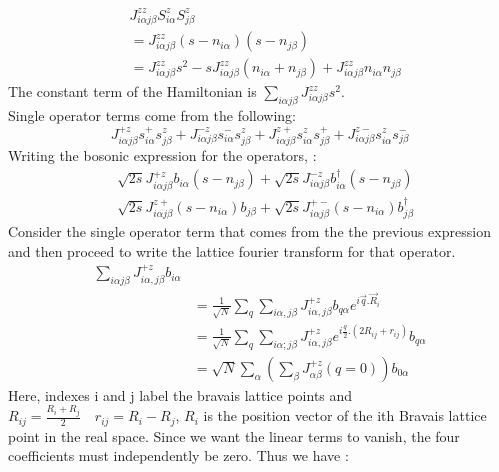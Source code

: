 \begin{equation}
\begin{split}
&J^{zz}_{i\alpha j\beta}S^z_{i\alpha}S^z_{j\beta} \\
&= J^{zz}_{i\alpha j\beta}(s - n_{i\alpha})( s - n_{j\beta} )\\
&=J^{zz}_{i\alpha j\beta}s^2 - sJ^{zz}_{i\alpha j\beta}(n_{i\alpha} + n_{j\beta}) + J^{zz}_{i\alpha j\beta}n_{i\alpha}n_{j\beta}
\end{split}
\end{equation}
The constant term of the Hamiltonian is $ \sum_{i\alpha j\beta}^{}J^{zz}_{i\alpha j\beta}s^2 $.\\
Single operator terms come from the following:
\begin{equation}
J^{+z}_{i\alpha j\beta}s^{+}_{i\alpha}s^{z}_{j\beta} + J^{-z}_{i\alpha j\beta}s^{-}_{i\alpha}s^{z}_{j\beta} + J^{z+}_{i\alpha j\beta}s^{z}_{i\alpha}s^{+}_{j\beta} + J^{z-}_{i\alpha j\beta}s^{z}_{i\alpha}s^{-}_{j\beta}
\end{equation}
Writing the bosonic expression for the operators, :
\begin{equation}
\begin{split}			
&\sqrt{2s}J^{+z}_{i\alpha j\beta}b_{i\alpha}(s-n_{j\beta}) + \sqrt{2s}J^{-z}_{i\alpha j\beta}b_{i\alpha}^\dagger(s - n_{j\beta})\\
&\sqrt{2s}J^{z+}_{i\alpha j\beta}(s - n_{i\alpha})b_{j\beta} + \sqrt{2s}J^{+-}_{i\alpha j\beta}(s - n_{i\alpha})b_{j\beta}^\dagger
\end{split}
\end{equation}
Consider the single operator term that comes from the the previous expression and then proceed to write the lattice fourier transform for that operator.
\begin{equation}
\begin{split}
\sum_{i\alpha j\beta}^{}J^{+z}_{i\alpha,j\beta}b_{i\alpha}&\\
& = \frac{1}{\sqrt{N}} \sum_{q}^{}\sum_{i\alpha,j\beta}^{}J^{+z}_{i\alpha,j\beta}b_{q\alpha}e^{i\vec{q}.\vec{R}_i}\\
& = \frac{1}{\sqrt{N}}\sum_{q}^{}\sum_{i\alpha;j\beta}^{}J^{+z}_{i\alpha,j\beta}e^{i\frac{q}{2}.(2R_{ij} + r_{ij})}b_{q\alpha}\\
& = \sqrt{N}\sum_{\alpha}^{}(\sum_{\beta}^{}J^{+z}_{\alpha \beta}(q=0))b_{0\alpha}
\end{split}
\end{equation}
Here, indexes i and j label the bravais lattice points and $ R_{ij} = \frac{R_i + R_j}{2} \quad r_{ij} = R_i - R_j$, $ R_i $ is the position vector of the ith Bravais lattice point in the real space. Since we want the linear terms to vanish, the four coefficients must independently be zero. Thus we have :
